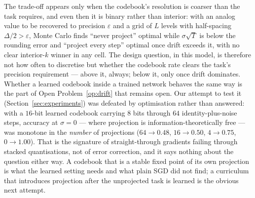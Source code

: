 The trade-off appears only when the codebook's resolution is coarser than the
task requires, and even then it is binary rather than interior: with an analog
value to be recovered to precision $\varepsilon$ and a grid of $L$ levels with
half-spacing $\Delta/2 > \varepsilon$, Monte Carlo finds ``never project''
optimal while $\sigma\sqrt{T}$ is below the rounding error and ``project every
step'' optimal once drift exceeds it, with no clear interior-$k$ winner in any
cell. The design question, in this model, is therefore not how often to
discretise but whether the codebook rate clears the task's precision
requirement --- above it, always; below it, only once drift dominates. Whether
a learned codebook inside a trained network behaves the same way is the part
of Open Problem~\ref{op:drift} that remains open. Our attempt to test it
(Section~\ref{sec:experiments}) was defeated by optimisation rather than
answered: with a $16$-bit learned codebook carrying $8$ bits through $64$
identity-plus-noise steps, accuracy at $\sigma = 0$ --- where projection is
information-theoretically free --- was monotone in the \emph{number} of
projections ($64 \to 0.48$, $16 \to 0.50$, $4 \to 0.75$, $0 \to 1.00$).
That is the signature of straight-through gradients failing through stacked
quantisations, not of error correction, and it says nothing about the
question either way. A codebook that is a stable fixed point of its own
projection is what the learned setting needs and what plain SGD did not find;
a curriculum that introduces projection after the unprojected task is learned
is the obvious next attempt.
